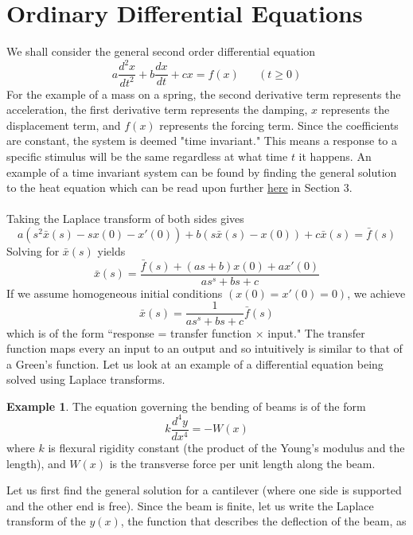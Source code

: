 \documentclass{report}
\theoremstyle{definition}
\newtheorem{example}[theorem]{Example}
\theoremstyle{remark}
\newcommand{\twen}{\hspace{20pt}}
\newcommand{\od}[2]{\frac{d #1}{d#2}}
\newcommand{\odt}[2]{\frac{d^2 #1}{d#2^2}}
\begin{document}
\section{Ordinary Differential Equations}
We shall consider the general second order differential equation 
\begin{equation*}
    a\odt{x}{t} +b\od{x}{t}+cx = f(x) \twen(t\geq0)
\end{equation*}
For the example of a mass on a spring, the second derivative term represents the acceleration, the first derivative term represents the damping, $x$ represents the displacement term, and $f(x)$ represents the forcing term. Since the coefficients are constant, the system is deemed "time invariant." This means a response to a specific stimulus will be the same regardless at what time $t$ it happens. An example of a time invariant system can be found by finding the general solution to the heat equation which can be read upon further \href{https://www.overleaf.com/read/yjwqnxvbxdsj#f891eb}{here} in Section 3.\\\\
Taking the Laplace transform of both sides gives 
\begin{equation*}
    a(s^2\bar{x}(s)-sx(0)-x'(0))+b(s\bar{x}(s)-x(0))+c\bar{x}(s)=\bar{f}(s)
\end{equation*}
Solving for $\bar{x}(s)$ yields 
\begin{equation*}
    \bar{x}(s) = \frac{\bar{f}(s)+(as+b)x(0)+ax'(0)}{as^s+bs+c}
\end{equation*}
If we assume homogeneous initial conditions $(x(0) = x'(0)=0)$, we achieve 
\begin{equation*}
    \bar{x}(s) = \frac{1}{as^s+bs+c}\bar{f}(s)
\end{equation*}
which is of the form ``response = transfer function $\times$ input." The transfer function maps every an input to an output and so intuitively is similar to that of a Green's function. Let us look at an example of a differential equation being solved using Laplace transforms.
\begin{example}
    The equation governing the bending of beams is of the form 
    \begin{equation*}
        k\od{^4y}{x^4} = -W(x)
    \end{equation*}
    where $k$ is flexural rigidity constant (the product of the Young's modulus and the length), and $W(x)$ is the transverse force per unit length along the beam. 
\end{example}
Let us first find the general solution for a cantilever (where one side is supported and the other end is free). Since the beam is finite, let us write the Laplace transform of the $y(x)$, the function that describes the deflection of the beam, as 
\end{document}
